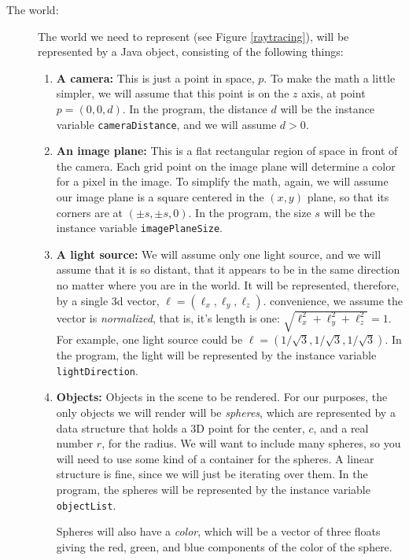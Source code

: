 \documentclass{article}
\begin{document}
\begin{description}
\item[The world:]
  
  The world we need to represent (see Figure \ref{raytracing}),
  will be represented by a Java object, consisting
of the following things:
\begin{enumerate}
\item{\bf A camera:} This is just a point in space, $p$.  To make the math
  a little simpler, we will assume that this point is on the $z$ axis,
  at point $p=(0,0,d)$. In the program, the distance $d$ will be
  the instance variable   \verb|cameraDistance|, and we will assume $d
  > 0$. 
\item{\bf An image plane:} This is a flat rectangular region of space in
  front of the camera.  Each grid point on the image plane will
  determine a color for a pixel in the image.  To simplify the math,
  again, we will assume our image plane is a square centered in the
  $(x,y)$ plane, so that its corners are at $(\pm s , \pm s, 0)$.  In
  the program, the size $s$ will be the instance variable
  \verb|imagePlaneSize|.
\item{\bf A light source:} We will assume only one light source, and we
  will assume that it is so distant, that it appears to be in the same
  direction no matter where you are in the world.  It will be
  represented, therefore, by a single 3d vector, $\ell =
  (\ell_x,\ell_y,\ell_z)$.  convenience, we assume the vector is {\em
    normalized}, that is, it's length is one: $\sqrt{\ell_x^2 +
    \ell_y^2 + \ell_z^2} = 1$.  For example, one light source could be
  $\ell = (1/\sqrt{3},1/\sqrt{3},1/\sqrt{3})$.  In the program, the
  light will be represented by the instance variable
  \verb|lightDirection|. 
\item{\bf Objects:} Objects in the scene to be rendered.  For our
  purposes, the only objects we will render will be {\em spheres},
  which are represented by a data structure that holds a 3D point for
  the center, $c$, and a real number $r$, for the radius.  We will
  want to include many spheres, so you will need to use some kind of a
  container for the spheres.  A linear structure is fine, since we
  will just be iterating over them.  In the program, the spheres will
  be represented by the instance variable \verb|objectList|.

  Spheres will also have a {\em color}, which will be a vector of
  three floats giving the red, green, and blue components of the color
  of the sphere.
\end{enumerate}



\end{description}
\end{document}
